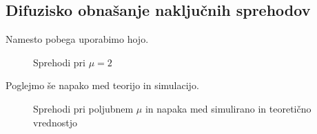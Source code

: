 \subsection{Difuzisko obnašanje naključnih sprehodov}
Namesto pobega uporabimo hojo. 
\begin{figure}[h]
    \begin{center}
    \end{center}
    \caption{Sprehodi pri $\mu = 2$}
\end{figure}
\newpage
Poglejmo še napako med teorijo in simulacijo.
\begin{figure}[h]
    \begin{center}
    \end{center}
    \caption{Sprehodi pri poljubnem $\mu$ in napaka med simulirano in teoretično vrednostjo}
\end{figure}